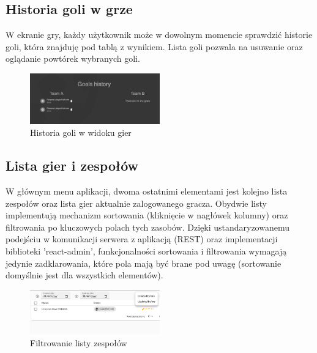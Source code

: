 \subsection{Historia goli w grze}

W ekranie gry, każdy użytkownik może w dowolnym momencie sprawdzić historie goli, która znajduję pod tablą z wynikiem. Lista goli pozwala na usuwanie oraz oglądanie powtórek wybranych goli.

\begin{figure}[h!]
  \centering
    \includegraphics[width=0.5\textwidth]{images/player/goals history.png}
  \caption{Historia goli w widoku gier}
  \label{fig:mobile}
\end{figure}

\subsection{Lista gier i zespołów}

W głównym menu aplikacji, dwoma ostatnimi elementami jest kolejno lista zespołów oraz lista gier aktualnie zalogowanego gracza. Obydwie listy implementują mechanizm sortowania (kliknięcie w nagłówek kolumny) oraz filtrowania po kluczowych polach tych zasobów. 
Dzięki ustandaryzowanemu podejściu w komunikacji serwera z aplikacją (REST) oraz implementacji biblioteki 'react-admin', funkcjonalności sortowania i filtrowania wymagają jedynie zadklarowania, które pola mają być brane pod uwagę (sortowanie domyślnie jest dla wszystkich elementów).

\begin{figure}[h!]
  \centering
    \includegraphics[width=0.5\textwidth]{images/player/listFilters.png}
  \caption{Filtrowanie listy zespołów}
  \label{fig:mobile}
\end{figure}
